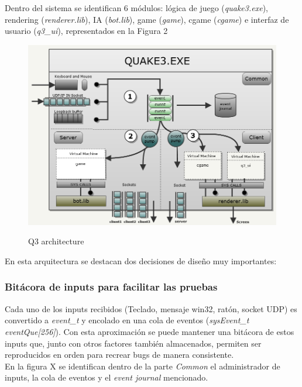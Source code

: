 \documentclass[a4paper,12pt]{report}
\begin{document}
	Dentro del sistema se identifican 6 módulos: lógica de juego (\textit{quake3.exe}), rendering (\textit{renderer.lib}), IA (\textit{bot.lib}), game (\textit{game}), cgame (\textit{cgame}) e interfaz de usuario (\textit{q3\_ui}), representados en la Figura 2  

		\begin{center}
			\begin{figure}[h]
				\includegraphics[width=1\textwidth]{images/q3_architecture}
				\label{fig:architecture}
				\caption{Q3 architecture}
			\end{figure}
		\end{center}
	
	En esta arquitectura se destacan dos decisiones de diseño muy importantes:
	
	\subsubsection{Bitácora de inputs para facilitar las pruebas}
	
	Cada uno de los inputs recibidos (Teclado, mensaje win32, ratón, socket UDP) es convertido a \textit{event\_t} y encolado en una cola de eventos (\textit{sysEvent\_t eventQue[256]}). Con esta aproximación se puede mantener una bitácora de estos inputs que, junto con otros factores también almacenados, permiten ser reproducidos en orden para recrear bugs de manera consistente. \cite{johncplan}\\
	
	En la figura X se identifican dentro de la parte \textit{Common} el administrador de inputs, la cola de eventos y el \textit{event journal} mencionado.
	
\end{document}
